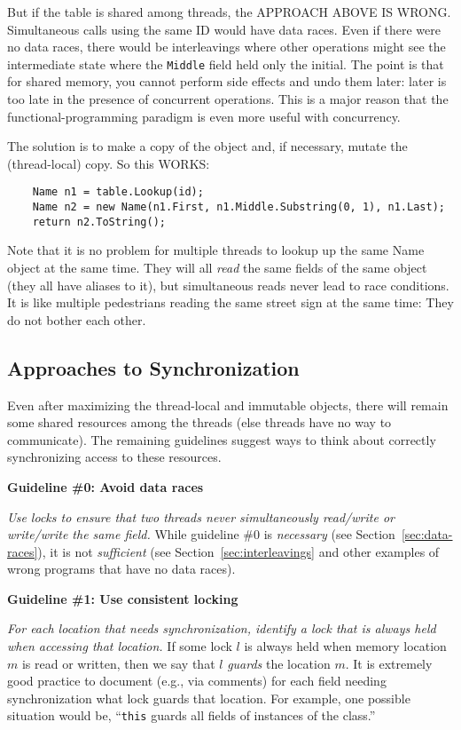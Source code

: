 \documentclass[10pt]{article}
\begin{document}
But if the table is shared among threads, the APPROACH ABOVE IS WRONG.
Simultaneous calls using the same ID would have data races.  Even if
there were no data races, there would be interleavings where other
operations might see the intermediate state where the {\tt Middle}
field held only the initial.  The point is that for shared memory, you
cannot perform side effects and undo them later: later is too late in the
presence of concurrent operations.  This is a major reason that the
functional-programming paradigm is even more useful with concurrency.

The solution is to make a copy of the object and, if necessary, mutate the
(thread-local) copy.  So this WORKS:
\begin{verbatim}
    Name n1 = table.Lookup(id);
    Name n2 = new Name(n1.First, n1.Middle.Substring(0, 1), n1.Last);
    return n2.ToString();
\end{verbatim}

Note that it is no problem for multiple threads to lookup up the same
Name object at the same time.  They will all \emph{read} the same
fields of the same object (they all have aliases to it), but
simultaneous reads never lead to race conditions.  It is like
multiple pedestrians reading the same street sign at the same time:
They do not bother each other.

\subsection{Approaches to Synchronization}

Even after maximizing the thread-local and immutable objects, there
will remain some shared resources among the threads (else threads have
no way to communicate).  The remaining guidelines suggest ways to
think about correctly synchronizing access to these resources.

\medskip
\noindent\textbf{Guideline \#0: Avoid data races}  
\medskip

\emph{Use locks to ensure that two threads never simultaneously
  read/write or write/write the same field.}  While guideline \#0 is
\emph{necessary} (see Section~\ref{sec:data-races}), it is not
\emph{sufficient} (see Section~\ref{sec:interleavings} and other
examples of wrong programs that have no data races).

\medskip
\noindent\textbf{Guideline \#1: Use consistent locking}  
\medskip

\emph{For each location that needs synchronization, identify a lock
  that is always held when accessing that location.}  If some lock $l$
  is always held when memory location $m$ is read or written, then we
  say that $l$ \emph{guards} the location $m$.  It is extremely good
  practice to document (e.g., via comments) for each field needing
  synchronization what lock guards that location.  For example, one
  possible situation would be, ``{\tt this} guards all
  fields of instances of the class.''
\end{document}
